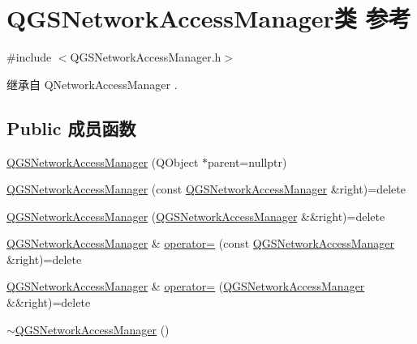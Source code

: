 \hypertarget{class_q_g_s_network_access_manager}{}\section{Q\+G\+S\+Network\+Access\+Manager类 参考}
\label{class_q_g_s_network_access_manager}


{\ttfamily \#include $<$Q\+G\+S\+Network\+Access\+Manager.\+h$>$}



继承自 Q\+Network\+Access\+Manager .

\subsection*{Public 成员函数}
\begin{DoxyCompactItemize}
\item 
\mbox{\hyperlink{class_q_g_s_network_access_manager_a04a7fbf512a7e6761d5040ddb377f651}{Q\+G\+S\+Network\+Access\+Manager}} (Q\+Object $\ast$parent=nullptr)
\item 
\mbox{\hyperlink{class_q_g_s_network_access_manager_ad14debab0218490f13a253a33959be24}{Q\+G\+S\+Network\+Access\+Manager}} (const \mbox{\hyperlink{class_q_g_s_network_access_manager}{Q\+G\+S\+Network\+Access\+Manager}} \&right)=delete
\item 
\mbox{\hyperlink{class_q_g_s_network_access_manager_a820d1d377289731ae4c469d9ff02722e}{Q\+G\+S\+Network\+Access\+Manager}} (\mbox{\hyperlink{class_q_g_s_network_access_manager}{Q\+G\+S\+Network\+Access\+Manager}} \&\&right)=delete
\item 
\mbox{\hyperlink{class_q_g_s_network_access_manager}{Q\+G\+S\+Network\+Access\+Manager}} \& \mbox{\hyperlink{class_q_g_s_network_access_manager_a58349ea13fa8102e2efb755b39048e20}{operator=}} (const \mbox{\hyperlink{class_q_g_s_network_access_manager}{Q\+G\+S\+Network\+Access\+Manager}} \&right)=delete
\item 
\mbox{\hyperlink{class_q_g_s_network_access_manager}{Q\+G\+S\+Network\+Access\+Manager}} \& \mbox{\hyperlink{class_q_g_s_network_access_manager_ac3b902edd7fdd8db2d89ffae2d57d37f}{operator=}} (\mbox{\hyperlink{class_q_g_s_network_access_manager}{Q\+G\+S\+Network\+Access\+Manager}} \&\&right)=delete
\item 
\mbox{\hyperlink{class_q_g_s_network_access_manager_ab528a4a1818ad954e72ad168227eee6d}{$\sim$\+Q\+G\+S\+Network\+Access\+Manager}} ()
\end{DoxyCompactItemize}
